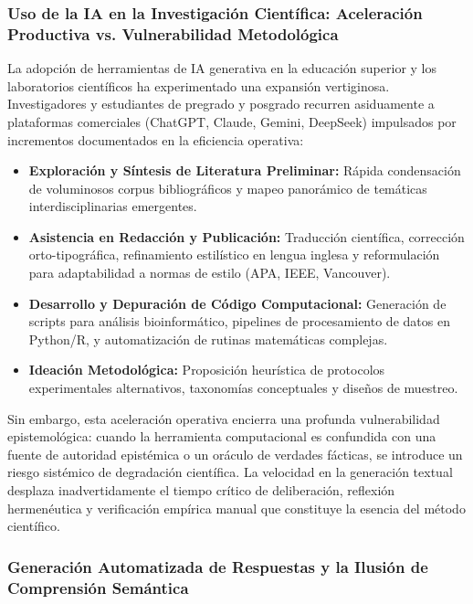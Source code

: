 \subsubsection{Uso de la IA en la Investigación Científica: Aceleración Productiva vs. Vulnerabilidad Metodológica}

La adopción de herramientas de IA generativa en la educación superior y los laboratorios científicos ha experimentado una expansión vertiginosa. Investigadores y estudiantes de pregrado y posgrado recurren asiduamente a plataformas comerciales (ChatGPT, Claude, Gemini, DeepSeek) impulsados por incrementos documentados en la eficiencia operativa:

\begin{itemize}
    \item \textbf{Exploración y Síntesis de Literatura Preliminar:} Rápida condensación de voluminosos corpus bibliográficos y mapeo panorámico de temáticas interdisciplinarias emergentes.
    \item \textbf{Asistencia en Redacción y Publicación:} Traducción científica, corrección orto-tipográfica, refinamiento estilístico en lengua inglesa y reformulación para adaptabilidad a normas de estilo (APA, IEEE, Vancouver).
    \item \textbf{Desarrollo y Depuración de Código Computacional:} Generación de scripts para análisis bioinformático, pipelines de procesamiento de datos en Python/R, y automatización de rutinas matemáticas complejas.
    \item \textbf{Ideación Metodológica:} Proposición heurística de protocolos experimentales alternativos, taxonomías conceptuales y diseños de muestreo.
\end{itemize}

Sin embargo, esta aceleración operativa encierra una profunda vulnerabilidad epistemológica: cuando la herramienta computacional es confundida con una fuente de autoridad epistémica o un oráculo de verdades fácticas, se introduce un riesgo sistémico de degradación científica. La velocidad en la generación textual desplaza inadvertidamente el tiempo crítico de deliberación, reflexión hermenéutica y verificación empírica manual que constituye la esencia del método científico.

\subsubsection{Generación Automatizada de Respuestas y la Ilusión de Comprensión Semántica}

